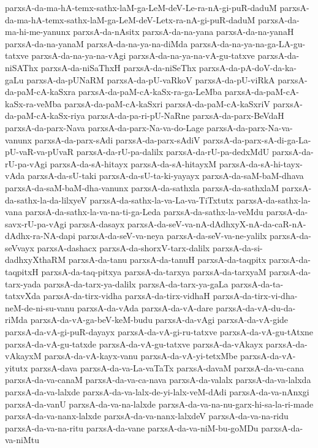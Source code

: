 {parxsA-da-ma-hA-temx-sathx-laM-ga-LeM-deV-Le-ra-nA-gi-puR-daduM
parxsA-da-ma-hA-temx-sathx-laM-ga-LeM-deV-Letx-ra-nA-gi-puR-daduM
parxsA-da-ma-hi-me-yanunx
parxsA-da-nAsitx
parxsA-da-na-yana
parxsA-da-na-yanaH
parxsA-da-na-yanaM
parxsA-da-na-ya-na-diMda
parxsA-da-na-ya-na-ga-LA-gu-tatxve
parxsA-da-na-ya-na-vAgi
parxsA-da-na-ya-na-vA-gu-tatxve
parxsA-da-niSAThx
parxsA-da-niSaThxH
parxsA-da-niSeThx
parxsA-da-pA-doV-da-ka-gaLu
parxsA-da-pUNaRM
parxsA-da-pU-vaRkoV
parxsA-da-pU-viRkA
parxsA-da-paM-cA-kaSxra
parxsA-da-paM-cA-kaSx-ra-ga-LeMba
parxsA-da-paM-cA-kaSx-ra-veMba
parxsA-da-paM-cA-kaSxri
parxsA-da-paM-cA-kaSxriV
parxsA-da-paM-cA-kaSx-riya
parxsA-da-pa-ri-pU-NaRne
parxsA-da-parx-BeVdaH
parxsA-da-parx-Nava
parxsA-da-parx-Na-va-do-Lage
parxsA-da-parx-Na-va-vanunx
parxsA-da-parx-sAdi
parxsA-da-parx-sAdiV
parxsA-da-parx-sA-di-ga-La-pU-vaR-va-pUvaR
parxsA-da-rU-pa-dalilx
parxsA-da-rU-pa-dedxMdU
parxsA-da-rU-pa-vAgi
parxsA-da-sA-hitayx
parxsA-da-sA-hitayxM
parxsA-da-sA-hi-tayx-vAda
parxsA-da-sU-taki
parxsA-da-sU-ta-ki-yayayx
parxsA-da-saM-baM-dhava
parxsA-da-saM-baM-dha-vanunx
parxsA-da-sathxla
parxsA-da-sathxlaM
parxsA-da-sathx-la-da-lilxyeV
parxsA-da-sathx-la-va-La-va-TiTxtutx
parxsA-da-sathx-la-vana
parxsA-da-sathx-la-va-na-ti-ga-Leda
parxsA-da-sathx-la-veMdu
parxsA-da-savx-rU-pa-vAgi
parxsA-dasayx
parxsA-da-seV-va-nA-dAdhxyX-nA-da-caR-nA-dAdhx-ra-NA-dapi
parxsA-da-seV-va-neya
parxsA-da-seV-va-ne-yalilx
parxsA-da-seVvayx
parxsA-dashacx
parxsA-da-shorxV-tarx-dalilx
parxsA-da-si-dadhxyXthaRM
parxsA-da-tanu
parxsA-da-tanuH
parxsA-da-taqpitx
parxsA-da-taqpitxH
parxsA-da-taq-pitxya
parxsA-da-tarxya
parxsA-da-tarxyaM
parxsA-da-tarx-yada
parxsA-da-tarx-ya-dalilx
parxsA-da-tarx-ya-gaLa
parxsA-da-ta-tatxvXda
parxsA-da-tirx-vidha
parxsA-da-tirx-vidhaH
parxsA-da-tirx-vi-dha-neM-de-ni-su-vanu
parxsA-da-vAda
parxsA-da-vA-dare
parxsA-da-vA-du-da-riMda
parxsA-da-vA-ga-beV-keM-budu
parxsA-da-vAgi
parxsA-da-vA-gide
parxsA-da-vA-gi-puR-dayayx
parxsA-da-vA-gi-ru-tatxve
parxsA-da-vA-gu-tAtxne
parxsA-da-vA-gu-tatxde
parxsA-da-vA-gu-tatxve
parxsA-da-vAkayx
parxsA-da-vAkayxM
parxsA-da-vA-kayx-vanu
parxsA-da-vA-yi-tetxMbe
parxsA-da-vA-yitutx
parxsA-dava
parxsA-da-va-La-vaTaTx
parxsA-davaM
parxsA-da-va-cana
parxsA-da-va-canaM
parxsA-da-va-ca-nava
parxsA-da-valalx
parxsA-da-va-lalxda
parxsA-da-va-lalxde
parxsA-da-va-lalx-de-yi-lalx-veM-dAdi
parxsA-da-va-nAnxgi
parxsA-da-vanU
parxsA-da-va-na-lalxde
parxsA-da-va-na-nu-garx-hi-sa-la-ri-made
parxsA-da-va-nanx-lalxde
parxsA-da-va-nanx-lalxdeV
parxsA-da-va-na-ridu
parxsA-da-va-na-ritu
parxsA-da-vane
parxsA-da-va-niM-bu-goMDu
parxsA-da-va-niMtu
}
